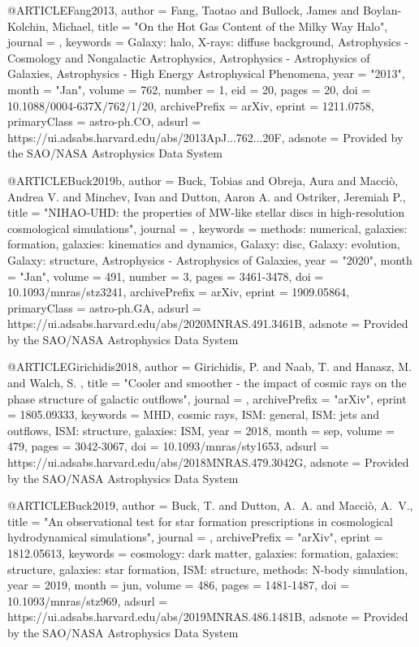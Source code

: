 \documentclass[useAMS,usenatbib]{mnras}
\begin{document}
{@ARTICLE{Fang2013,
       author = {{Fang}, Taotao and {Bullock}, James and {Boylan-Kolchin}, Michael},
        title = "{On the Hot Gas Content of the Milky Way Halo}",
      journal = {\apj},
     keywords = {Galaxy: halo, X-rays: diffuse background, Astrophysics - Cosmology and Nongalactic Astrophysics, Astrophysics - Astrophysics of Galaxies, Astrophysics - High Energy Astrophysical Phenomena},
         year = "2013",
        month = "Jan",
       volume = {762},
       number = {1},
          eid = {20},
        pages = {20},
          doi = {10.1088/0004-637X/762/1/20},
archivePrefix = {arXiv},
       eprint = {1211.0758},
 primaryClass = {astro-ph.CO},
       adsurl = {https://ui.adsabs.harvard.edu/abs/2013ApJ...762...20F},
      adsnote = {Provided by the SAO/NASA Astrophysics Data System}
}

@ARTICLE{Buck2019b,
       author = {{Buck}, Tobias and {Obreja}, Aura and {Macci{\`o}}, Andrea V. and
         {Minchev}, Ivan and {Dutton}, Aaron A. and {Ostriker}, Jeremiah P.},
        title = "{NIHAO-UHD: the properties of MW-like stellar discs in high-resolution cosmological simulations}",
      journal = {\mnras},
     keywords = {methods: numerical, galaxies: formation, galaxies: kinematics and dynamics, Galaxy: disc, Galaxy: evolution, Galaxy: structure, Astrophysics - Astrophysics of Galaxies},
         year = "2020",
        month = "Jan",
       volume = {491},
       number = {3},
        pages = {3461-3478},
          doi = {10.1093/mnras/stz3241},
archivePrefix = {arXiv},
       eprint = {1909.05864},
 primaryClass = {astro-ph.GA},
       adsurl = {https://ui.adsabs.harvard.edu/abs/2020MNRAS.491.3461B},
      adsnote = {Provided by the SAO/NASA Astrophysics Data System}
}


@ARTICLE{Girichidis2018,
   author = {{Girichidis}, P. and {Naab}, T. and {Hanasz}, M. and {Walch}, S.
	},
    title = "{Cooler and smoother - the impact of cosmic rays on the phase structure of galactic outflows}",
  journal = {\mnras},
archivePrefix = "arXiv",
   eprint = {1805.09333},
 keywords = {MHD, cosmic rays, ISM: general, ISM: jets and outflows, ISM: structure, galaxies: ISM},
     year = 2018,
    month = sep,
   volume = 479,
    pages = {3042-3067},
      doi = {10.1093/mnras/sty1653},
   adsurl = {https://ui.adsabs.harvard.edu/abs/2018MNRAS.479.3042G},
  adsnote = {Provided by the SAO/NASA Astrophysics Data System}
}

@ARTICLE{Buck2019,
   author = {{Buck}, T. and {Dutton}, A.~A. and {Macci{\`o}}, A.~V.},
    title = "{An observational test for star formation prescriptions in cosmological hydrodynamical simulations}",
  journal = {\mnras},
archivePrefix = "arXiv",
   eprint = {1812.05613},
 keywords = {cosmology: dark matter, galaxies: formation, galaxies: structure, galaxies: star formation, ISM: structure, methods: N-body simulation},
     year = 2019,
    month = jun,
   volume = 486,
    pages = {1481-1487},
      doi = {10.1093/mnras/stz969},
   adsurl = {https://ui.adsabs.harvard.edu/abs/2019MNRAS.486.1481B},
  adsnote = {Provided by the SAO/NASA Astrophysics Data System}
}

}
\end{document}
